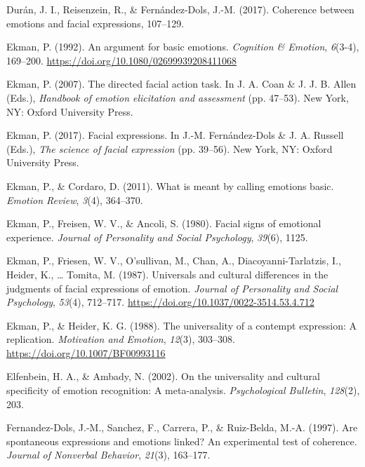 \documentclass[man]{apa6}
\begin{document}
\leavevmode\hypertarget{ref-duran2017coherence}{}%
Durán, J. I., Reisenzein, R., \& Fernández-Dols, J.-M. (2017). Coherence between emotions and facial expressions, 107--129.

\leavevmode\hypertarget{ref-ekman1992argument}{}%
Ekman, P. (1992). An argument for basic emotions. \emph{Cognition \& Emotion}, \emph{6}(3-4), 169--200. \url{https://doi.org/10.1080/02699939208411068}

\leavevmode\hypertarget{ref-ekman2007directed}{}%
Ekman, P. (2007). The directed facial action task. In J. A. Coan \& J. J. B. Allen (Eds.), \emph{Handbook of emotion elicitation and assessment} (pp. 47--53). New York, NY: Oxford University Press.

\leavevmode\hypertarget{ref-ekman2017facial}{}%
Ekman, P. (2017). Facial expressions. In J.-M. Fernández-Dols \& J. A. Russell (Eds.), \emph{The science of facial expression} (pp. 39--56). New York, NY: Oxford University Press.

\leavevmode\hypertarget{ref-ekman2011meant}{}%
Ekman, P., \& Cordaro, D. (2011). What is meant by calling emotions basic. \emph{Emotion Review}, \emph{3}(4), 364--370.

\leavevmode\hypertarget{ref-ekman1980facial}{}%
Ekman, P., Freisen, W. V., \& Ancoli, S. (1980). Facial signs of emotional experience. \emph{Journal of Personality and Social Psychology}, \emph{39}(6), 1125.

\leavevmode\hypertarget{ref-ekman1987universals}{}%
Ekman, P., Friesen, W. V., O'sullivan, M., Chan, A., Diacoyanni-Tarlatzis, I., Heider, K., \ldots{} Tomita, M. (1987). Universals and cultural differences in the judgments of facial expressions of emotion. \emph{Journal of Personality and Social Psychology}, \emph{53}(4), 712--717. \url{https://doi.org/10.1037/0022-3514.53.4.712}

\leavevmode\hypertarget{ref-ekman1988universality}{}%
Ekman, P., \& Heider, K. G. (1988). The universality of a contempt expression: A replication. \emph{Motivation and Emotion}, \emph{12}(3), 303--308. \url{https://doi.org/10.1007/BF00993116}

\leavevmode\hypertarget{ref-elfenbein2002universality}{}%
Elfenbein, H. A., \& Ambady, N. (2002). On the universality and cultural specificity of emotion recognition: A meta-analysis. \emph{Psychological Bulletin}, \emph{128}(2), 203.

\leavevmode\hypertarget{ref-fernandez1997spontaneous}{}%
Fernandez-Dols, J.-M., Sanchez, F., Carrera, P., \& Ruiz-Belda, M.-A. (1997). Are spontaneous expressions and emotions linked? An experimental test of coherence. \emph{Journal of Nonverbal Behavior}, \emph{21}(3), 163--177.
\end{document}
